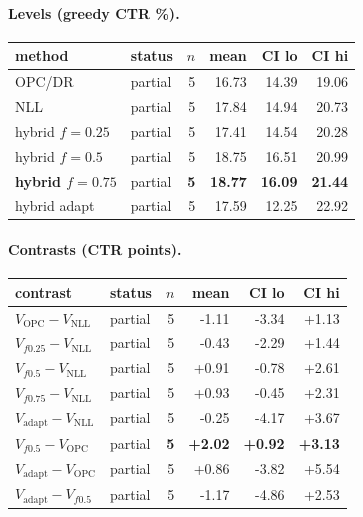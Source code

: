 \documentclass[10pt,a4paper]{article}
\begin{document}
\paragraph{Levels (greedy CTR \%).}
{\centering\small\begin{tabular}{llrrrr}
\toprule method & status & $n$ & mean & CI lo & CI hi \\
\midrule
OPC/DR & partial & 5 & 16.73 & 14.39 & 19.06 \\
NLL & partial & 5 & 17.84 & 14.94 & 20.73 \\
hybrid $f{=}0.25$ & partial & 5 & 17.41 & 14.54 & 20.28 \\
hybrid $f{=}0.5$ & partial & 5 & 18.75 & 16.51 & 20.99 \\
\textbf{hybrid $f{=}0.75$} & partial & \textbf{5} & \textbf{18.77} & \textbf{16.09} & \textbf{21.44} \\
hybrid adapt & partial & 5 & 17.59 & 12.25 & 22.92 \\
\bottomrule\end{tabular}\par}
\paragraph{Contrasts (CTR points).}
{\centering\small\begin{tabular}{llrrrr}
\toprule contrast & status & $n$ & mean & CI lo & CI hi \\
\midrule
$V_{\mathrm{OPC}}-V_{\mathrm{NLL}}$ & partial & 5 & -1.11 & -3.34 & +1.13 \\
$V_{f0.25}-V_{\mathrm{NLL}}$ & partial & 5 & -0.43 & -2.29 & +1.44 \\
$V_{f0.5}-V_{\mathrm{NLL}}$ & partial & 5 & +0.91 & -0.78 & +2.61 \\
$V_{f0.75}-V_{\mathrm{NLL}}$ & partial & 5 & +0.93 & -0.45 & +2.31 \\
$V_{\mathrm{adapt}}-V_{\mathrm{NLL}}$ & partial & 5 & -0.25 & -4.17 & +3.67 \\
\textbf{$V_{f0.5}-V_{\mathrm{OPC}}$} & partial & \textbf{5} & \textbf{+2.02} & \textbf{+0.92} & \textbf{+3.13} \\
$V_{\mathrm{adapt}}-V_{\mathrm{OPC}}$ & partial & 5 & +0.86 & -3.82 & +5.54 \\
$V_{\mathrm{adapt}}-V_{f0.5}$ & partial & 5 & -1.17 & -4.86 & +2.53 \\
\bottomrule\end{tabular}\par}
\end{document}
